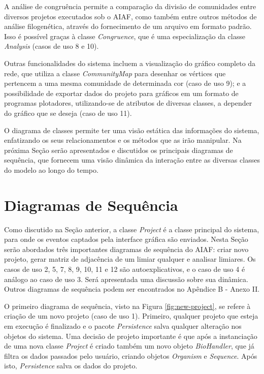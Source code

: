 A análise de congruência permite a comparação da divisão de comunidades entre diversos projetos executados sob o AIAF, como também entre outros métodos de
análise filogenética, através do fornecimento de um arquivo em formato padrão. Isso é possível graças à classe \textit{Congruence}, que é uma
especialização da classe
\textit{Analysis} (casos de uso 8 e 10).

Outras funcionalidades do sistema incluem a visualização do gráfico completo da rede, que utiliza a classe \textit{CommunityMap} para desenhar
os vértices que pertencem a uma mesma comunidade de determinada cor (caso de uso 9); e a possibilidade de exportar dados do projeto para
gráficos em um formato de programas plotadores, utilizando-se de atributos de diversas classes, a depender do gráfico que se deseja (caso de uso 11).

O diagrama de classes permite ter uma visão estática das informações do sistema, enfatizando os seus relacionamentos e os métodos que as irão manipular.
Na próxima Seção serão apresentados e discutidos os principais diagramas de sequência, que fornecem uma visão dinâmica da interação entre as diversas
classes do modelo ao longo do tempo.

\section{Diagramas de Sequência} \label{sec:dinamica}

Como discutido na Seção anterior, a classe \textit{Project} é a classe principal do sistema, para onde os eventos captados pela interface gráfica são
enviados. Nesta Seção serão abordados três importantes diagramas de sequência do AIAF: criar novo projeto, gerar matriz de adjacência de um limiar qualquer
e analisar limiares. Os casos de uso 2, 5, 7, 8, 9, 10, 11 e 12 são autoexplicativos, e o caso de uso 4 é análogo ao caso de uso 3. Será
apresentada uma discussão sobre sua dinâmica. Outros diagramas de sequência podem ser encontrados no Apêndice B - Anexo II.

O primeiro diagrama de sequência, visto na Figura \ref{fig:new-project}, se refere à criação de um novo projeto (caso de uso 1). Primeiro, qualquer projeto
que esteja em execução é finalizado e o pacote \textit{Persistence} salva qualquer alteração nos objetos do sistema. Uma decisão de projeto importante
é que após a instanciação de uma nova classe \textit{Project} é criado também um novo objeto \textit{BioHandler}, que já filtra os dados passados pelo
usuário, criando objetos \textit{Organism} e \textit{Sequence}. Após isto, \textit{Persistence} salva os dados do projeto.


